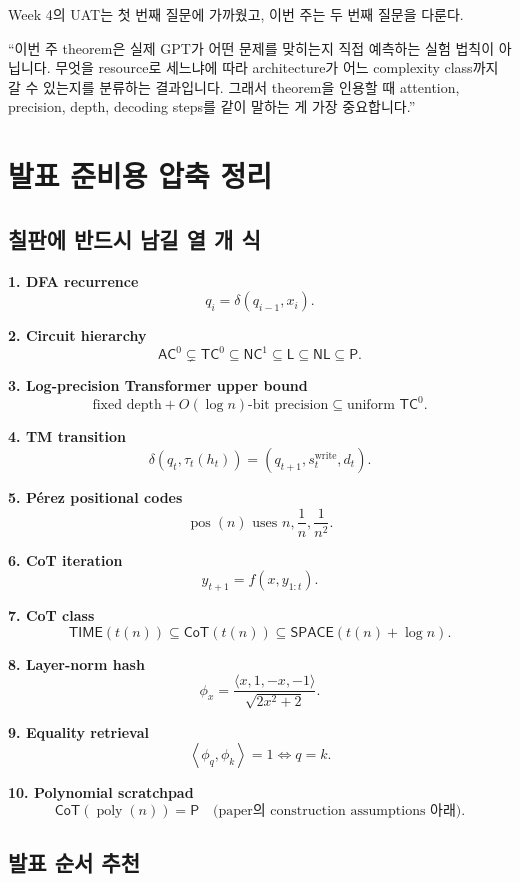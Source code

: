 \documentclass[11pt,a4paper,oneside,openany]{memoir}
\newcommand{\inner}[2]{\left\langle #1,#2\right\rangle}
\theoremstyle{definition}
\newcommand{\poly}{\operatorname{poly}}
\newcommand{\TIME}{\mathsf{TIME}}
\newcommand{\SPACE}{\mathsf{SPACE}}
\newcommand{\AC}{\mathsf{AC}}
\newcommand{\TC}{\mathsf{TC}}
\newcommand{\NC}{\mathsf{NC}}
\newcommand{\CoT}{\mathsf{CoT}}
\newcommand{\Lclass}{\mathsf{L}}
\newcommand{\NL}{\mathsf{NL}}
\newcommand{\Pclass}{\mathsf{P}}
\begin{document}
Week 4의 UAT는 첫 번째 질문에 가까웠고, 이번 주는 두 번째 질문을 다룬다.

\begin{presentbox}
``이번 주 theorem은 실제 GPT가 어떤 문제를 맞히는지 직접 예측하는 실험 법칙이 아닙니다. 무엇을 resource로 세느냐에 따라 architecture가 어느 complexity class까지 갈 수 있는지를 분류하는 결과입니다. 그래서 theorem을 인용할 때 attention, precision, depth, decoding steps를 같이 말하는 게 가장 중요합니다.''
\end{presentbox}

\chapter{발표 준비용 압축 정리}

\section{칠판에 반드시 남길 열 개 식}

\textbf{1. DFA recurrence}
\[
q_i=\delta(q_{i-1},x_i).
\]

\textbf{2. Circuit hierarchy}
\[
\AC^0\subsetneq\TC^0\subseteq\NC^1\subseteq\Lclass\subseteq\NL\subseteq\Pclass.
\]

\textbf{3. Log-precision Transformer upper bound}
\[
\text{fixed depth}+O(\log n)\text{-bit precision}
\subseteq
\text{uniform }\TC^0.
\]

\textbf{4. TM transition}
\[
\delta(q_t,\tau_t(h_t))
=(q_{t+1},s_t^{\mathrm{write}},d_t).
\]

\textbf{5. Pérez positional codes}
\[
\operatorname{pos}(n)\text{ uses }n,\frac1n,\frac1{n^2}.
\]

\textbf{6. CoT iteration}
\[
y_{t+1}=f(x,y_{1:t}).
\]

\textbf{7. CoT class}
\[
\TIME(t(n))
\subseteq
\CoT(t(n))
\subseteq
\SPACE(t(n)+\log n).
\]

\textbf{8. Layer-norm hash}
\[
\phi_x=
\frac{\langle x,1,-x,-1\rangle}{\sqrt{2x^2+2}}.
\]

\textbf{9. Equality retrieval}
\[
\inner{\phi_q}{\phi_k}=1\iff q=k.
\]

\textbf{10. Polynomial scratchpad}
\[
\CoT(\poly(n))=\Pclass
\quad\text{(paper의 construction assumptions 아래).}
\]

\section{발표 순서 추천}
\end{document}
